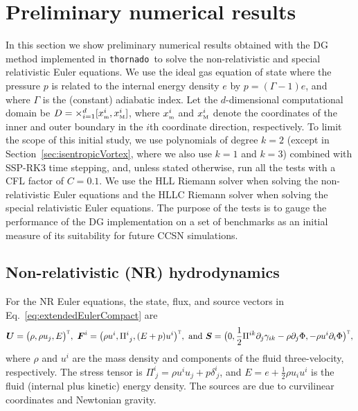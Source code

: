 \documentclass[letterpaper]{jpconf}
\newcommand{\vect}[1]{\boldsymbol{#1}}
\newcommand{\f}[2]{\frac{#1}{#2}}
\newcommand{\pd}[2]{\partial_{#2}{#1}}
\newcommand{\xMin}{x_{\textnormal{\tiny m}}}
\newcommand{\xMax}{x_{\textnormal{\tiny M}}}
\newcommand{\trans}{\textnormal{\tiny\textsc{T}}}
\newcommand{\thornado}{\texttt{thornado}}
\begin{document}
\section{Preliminary numerical results}
\label{sec:numerical}

In this section we show preliminary numerical results obtained with the DG method implemented in \thornado\ to solve the non-relativistic and special relativistic Euler equations.  
We use the ideal gas equation of state where the pressure $p$ is related to the internal energy density $e$ by $p=(\Gamma-1)e$, and where $\Gamma$ is the (constant) adiabatic index.  
Let the $d$-dimensional computational domain be $D=\times_{i=1}^{d}[\xMin^{i},\xMax^{i}]$, where $\xMin^{i}$ and $\xMax^{i}$ denote the coordinates of the inner and outer boundary in the $i$th coordinate direction, respectively.  
To limit the scope of this initial study, we use polynomials of degree $k=2$ (except in Section~\ref{sec:isentropicVortex}, where we also use $k=1$ and $k=3$) combined with SSP-RK3 time stepping, and, unless stated otherwise, run all the tests with a CFL factor of $C=0.1$.  
We use the HLL Riemann solver when solving the non-relativistic Euler equations and the HLLC Riemann solver when solving the special relativistic Euler equations.  
The purpose of the tests is to gauge the performance of the DG implementation on a set of benchmarks as an initial measure of its suitability for future CCSN simulations.  

\subsection{Non-relativistic (NR) hydrodynamics}

For the NR Euler equations, the state, flux, and source vectors in Eq.~\eqref{eq:extendedEulerCompact} are
\begin{equation}
  \vect{U}=\big(\rho,\rho u_{j},E\big)^{\trans},~
  \vect{F}^{i}=\big(\rho u^{i},\Pi^{i}_{~j},(E+p)u^{i}\big)^{\trans},~
  \text{and}~
  \vect{S}=\big(0,\f{1}{2}\Pi^{ik}\pd{\gamma_{ik}}{j}-\rho\pd{\Phi}{j},-\rho u^{i}\pd{\Phi}{i}\big)^{\trans},
\end{equation}
where $\rho$ and $u^{i}$ are the mass density and components of the fluid three-velocity, respectively.  
The stress tensor is $\Pi^{i}_{~j}=\rho u^{i} u_{j}+p\delta^{i}_{~j}$, and $E=e+\f{1}{2}\rho u_{i} u^{i}$ is the fluid (internal plus kinetic) energy density.  
The sources are due to curvilinear coordinates and Newtonian gravity.  
\end{document}
